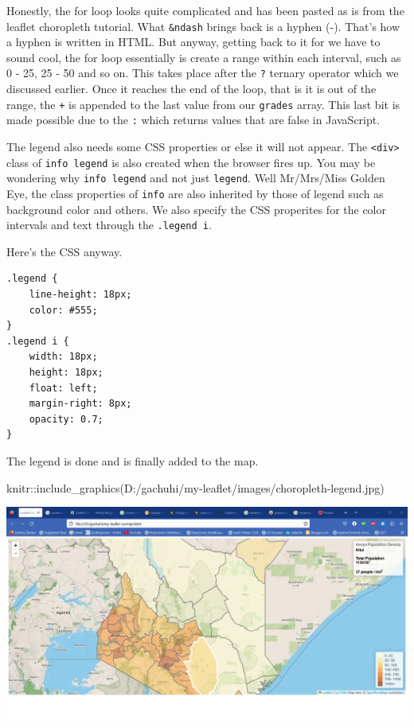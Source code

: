 \documentclass[
]{book}
\newenvironment{Shaded}{\begin{snugshade}}{\end{snugshade}}
\newcommand{\FunctionTok}[1]{\textcolor[rgb]{0.00,0.00,0.00}{#1}}
\newcommand{\NormalTok}[1]{#1}
\newcommand{\SpecialCharTok}[1]{\textcolor[rgb]{0.00,0.00,0.00}{#1}}
\newcommand{\StringTok}[1]{\textcolor[rgb]{0.31,0.60,0.02}{#1}}
\begin{document}
Honestly, the for loop looks quite complicated and has been pasted as is from the leaflet choropleth tutorial. What \texttt{\&ndash} brings back is a hyphen (-). That's how a hyphen is written in HTML. But anyway, getting back to it for we have to sound cool, the for loop essentially is create a range within each interval, such as 0 - 25, 25 - 50 and so on. This takes place after the \texttt{?} ternary operator which we discussed earlier. Once it reaches the end of the loop, that is it is out of the range, the \texttt{+} is appended to the last value from our \texttt{grades} array. This last bit is made possible due to the \texttt{:} which returns values that are false in JavaScript.

The legend also needs some CSS properties or else it will not appear. The \texttt{\textless{}div\textgreater{}} class of \texttt{info\ legend} is also created when the browser fires up. You may be wondering why \texttt{info\ legend} and not just \texttt{legend}. Well Mr/Mrs/Miss Golden Eye, the class properties of \texttt{info} are also inherited by those of legend such as background color and others. We also specify the CSS properites for the color intervals and text through the \texttt{.legend\ i}.

Here's the CSS anyway.

\begin{verbatim}
.legend {
    line-height: 18px;
    color: #555;
}
.legend i {
    width: 18px;
    height: 18px;
    float: left;
    margin-right: 8px;
    opacity: 0.7;
}

\end{verbatim}

The legend is done and is finally added to the map.

\begin{Shaded}
\begin{Highlighting}[]
\NormalTok{knitr}\SpecialCharTok{::}\FunctionTok{include\_graphics}\NormalTok{(}\StringTok{\textquotesingle{}D:/gachuhi/my{-}leaflet/images/choropleth{-}legend.jpg\textquotesingle{}}\NormalTok{)}
\end{Highlighting}
\end{Shaded}

\includegraphics[width=26.67in]{../images/choropleth-legend}
\end{document}
